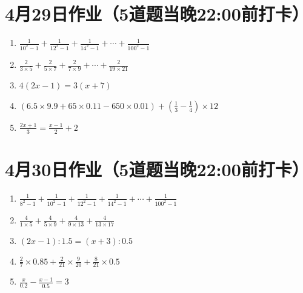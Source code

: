 \documentclass[UTF8,12pt,a4paper]{ctexart}
\newcommand{\BottomWriteSpace}{1.8cm}
\newenvironment{OnePageFiveFill}{
  \small
  \vspace*{0pt}
  \begin{enumerate}[leftmargin=*, itemsep=0pt, topsep=0pt, parsep=0pt, partopsep=0pt]
  \setlength{\parskip}{0pt}
}{
  \end{enumerate}
  \vspace*{\BottomWriteSpace}
  \normalsize
  \newpage
}
\newcommand{\Q}[1]{\item #1\par\vfill}
\newcommand{\Qlast}[1]{\item #1\par}
\begin{document}
\section*{4月29日作业（5道题当晚22:00前打卡）}
\begin{OnePageFiveFill}

\Q{$\displaystyle \frac{1}{10^2 - 1} + \frac{1}{12^2 - 1} + \frac{1}{14^2 - 1} + \cdots + \frac{1}{100^2 - 1}$}

\Q{$\displaystyle \frac{2}{3 \times 5} + \frac{2}{5 \times 7} + \frac{2}{7 \times 9} + \cdots + \frac{2}{19 \times 21}$}

\Q{$4(2x - 1) = 3(x + 7)$}

\Q{$\displaystyle (6.5 \times 9.9 + 65 \times 0.11 - 650 \times 0.01) + \left(\frac{1}{3} - \frac{1}{4}\right) \times 12$}

\Qlast{$\displaystyle \frac{2x+1}{3} = \frac{x-1}{2} + 2$}

\end{OnePageFiveFill}

\section*{4月30日作业（5道题当晚22:00前打卡）}
\begin{OnePageFiveFill}

\Q{$\displaystyle \frac{1}{8^2 - 1} + \frac{1}{10^2 - 1} + \frac{1}{12^2 - 1} + \frac{1}{14^2 - 1} + \cdots + \frac{1}{100^2 - 1}$}


\Q{$\displaystyle \frac{4}{1 \times 5} + \frac{4}{5 \times 9} + \frac{4}{9 \times 13} + \frac{4}{13 \times 17}$}

\Q{$\displaystyle (2x - 1) : 1.5 = (x + 3) : 0.5$}

\Q{$\displaystyle \frac{2}{7} \times 0.85 + \frac{2}{21} \times \frac{9}{20} + \frac{8}{21} \times 0.5$}

\Qlast{$\displaystyle \frac{x}{0.2} - \frac{x-1}{0.5} = 3$}

\end{OnePageFiveFill}
\end{document}
